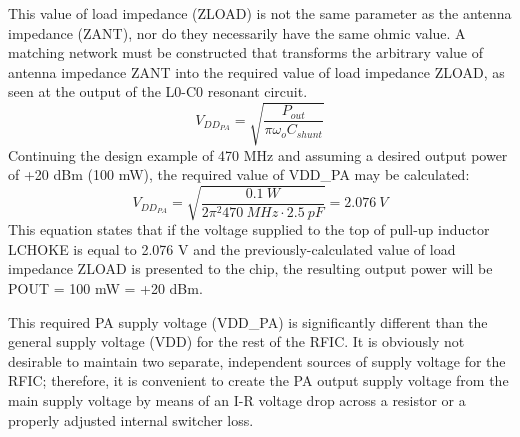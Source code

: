         This value of load impedance (ZLOAD) is not the same parameter as the antenna impedance (ZANT), nor 
        do they necessarily have the same ohmic value. A matching network must be constructed that 
        transforms the arbitrary value of antenna impedance ZANT into the required value of load impedance 
        ZLOAD, as seen at the output of the L0-C0 resonant circuit.
        \begin{equation}\label{EXP001:eq_spirit05}
          V_{DD_{PA}} = \sqrt{\frac{P_{out}}{\pi\omega_oC_{shunt}}}
        \end{equation}
        Continuing the design example of 470 MHz and assuming a desired output power of +20 dBm (100 mW), 
        the required value of VDD\_PA may be calculated:
        \begin{equation}\label{EXP001:eq_spirit06}
          V_{DD_{PA}} =\sqrt{\frac{\qty{0.1}{W}}{2\pi^2\qty{470}{MHz}\cdot\qty{2.5}{pF}}} = \qty{2.076}{V}
        \end{equation}
        This equation states that if the voltage supplied to the top of pull-up inductor LCHOKE is equal to 
        2.076 V and the previously-calculated value of load impedance ZLOAD is presented to the chip, the 
        resulting output power will be POUT = 100 mW = +20 dBm.
        
        This required PA supply voltage (VDD\_PA) is significantly different than the general supply 
        voltage (VDD) for the rest of the RFIC. It is obviously not desirable to maintain two separate, 
        independent sources of supply voltage for the RFIC; therefore, it is convenient to create the PA 
        output supply voltage from the main supply voltage by means of an I-R voltage drop across a 
        resistor or a properly adjusted internal switcher loss.
        
